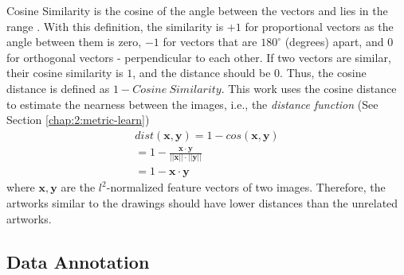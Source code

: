 Cosine Similarity is the cosine of the angle between the vectors and lies in the range \begin{math} [-1,+1] \end{math}. With this definition, the similarity is \begin{math} +1 \end{math} for proportional vectors as the angle between them is zero, \begin{math} -1 \end{math} for vectors that are \begin{math} 180^\circ \end{math} (degrees) apart, and \begin{math} 0 \end{math} for orthogonal vectors - perpendicular to each other. If two vectors are similar, their cosine similarity is \begin{math} 1 \end{math}, and the distance should be \begin{math} 0 \end{math}. Thus, the cosine distance is defined as \begin{math} 1 - Cosine \ Similarity \end{math}. This work uses the cosine distance to estimate the nearness between the images, i.e., the \textit{distance function} (See Section \ref{chap:2:metric-learn})
\begin{equation*}
\begin{split}
dist(\pmb{x}, \pmb{y}) = 1 - cos(\pmb{x}, \pmb{y}) \\
= 1 - \frac {\pmb{x} \cdot \pmb{y}}{||\pmb{x}|| \cdot ||\pmb{y}||} \\
= 1 - {\pmb{x} \cdot \pmb{y}}
\end{split}
\end{equation*}
where \begin{math} \pmb{x}, \pmb{y} \end{math} are the \begin{math} l^2 \end{math}-normalized feature vectors of two images.
Therefore, the artworks similar to the drawings should have lower distances than the unrelated artworks.


\subsection{Data Annotation}\label{chap:4:data-anno}

